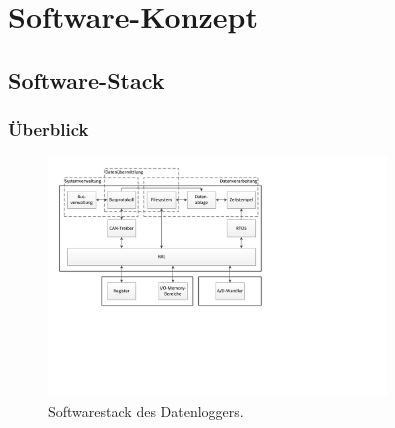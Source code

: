 %
%

\chapter{Software-Konzept}\label{chap.software}


\section{Software-Stack}\label{sec.sw_stack}


\subsection{Überblick}\label{subsec.sw_ueberblick}

\begin{figure}[H]
	\centering
		\includegraphics[width=0.8\textwidth]{images/visio/Softwarestack_Logger.pdf}
	\caption{Softwarestack des Datenloggers.}
	\label{fig.sw_logger}
\end{figure}

